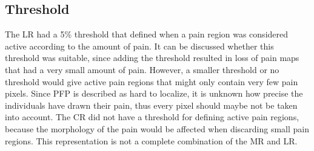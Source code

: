 \subsection{Threshold}
The LR had a 5\% threshold that defined when a pain region was considered active according to the amount of pain. It can be discussed whether this threshold was suitable, since adding the threshold resulted in loss of pain maps that had a very small amount of pain. However, a smaller threshold or no threshold would give active pain regions that might only contain very few pain pixels. Since PFP is described as hard to localize, it is unknown how precise the individuals have drawn their pain, thus every pixel should maybe not be taken into account.
The CR did not have a threshold for defining active pain regions, because the morphology of the pain would be affected when discarding small pain regions. This representation is not a complete combination of the MR and LR.

